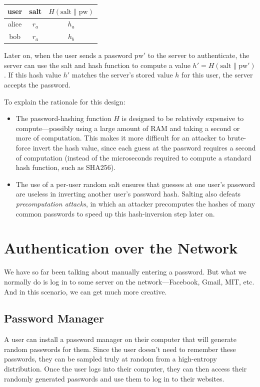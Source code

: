 \medskip
\begin{tabular}{c|c|c}
  user & salt & $H(\text{salt}\|\text{pw})$ \\
	\hline
	alice & $r_a$ & $h_a$ \\
	bob & $r_a$ & $h_b$ \\
\end{tabular}
\medskip

Later on, when the user sends a password $\text{pw}'$ to the server to authenticate, 
the server can use the salt and hash function to compute a value $h' = H(\text{salt}\|\text{pw}')$.
If this hash value $h'$ matches the server's stored value $h$ for this user,
the server accepts the password.

To explain the rationale for this design:
\begin{itemize}
  \item The password-hashing function $H$ is designed to be relatively expensive
        to compute---possibly using a large amount of RAM and taking a second or 
        more of computation.
        This makes it more difficult for an attacker to brute-force invert the
        hash value, since each guess at the password requires a second of computation
        (instead of the microseconds required to compute a standard hash function,
        such as SHA256).
  \item The use of a per-user random salt ensures that guesses at one user's password
        are useless in inverting another user's password hash.
        Salting also defeats \emph{precomputation attacks}, in which an attacker
        precomputes the hashes of many common passwords to speed up this hash-inversion
        step later on.
\end{itemize}


\section{Authentication over the Network}
We have so far been talking about manually entering a password. But what we normally do is log in to some server on the network---Facebook, Gmail, MIT, etc. And in this scenario, we can get much more creative.

\subsection{Password Manager}
A user can install a password manager on their computer that will generate random passwords for them. Since the user doesn't need to remember these passwords, they can be sampled truly at random from a high-entropy distribution. Once the user logs into their computer, they can then access their randomly generated passwords and use them to log in to their websites. 


